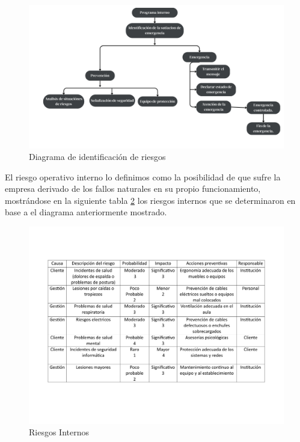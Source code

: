     \begin{figure}[H]
        \centering
        \includegraphics[scale=0.150]{21/img/diagramaIdentificacionRiesgos.pdf}
        \caption{Diagrama de identificación de riesgos}
        \label{fig:diagramaIdentificacionRiesgos}
    \end{figure}
    
    El riesgo operativo interno lo definimos como la posibilidad de que sufre la empresa derivado de los fallos naturales en su propio funcionamiento, mostrándose en la siguiente tabla \ref{fig:riesgosInternos} los riesgos internos que se determinaron en base a el diagrama anteriormente mostrado.
    \begin{figure}[H]
        \centering
        \includegraphics[scale=0.3]{21/img/tablaRiesgosInternos.pdf}
        \caption{Riesgos Internos}
        \label{fig:riesgosInternos}
    \end{figure}
    
